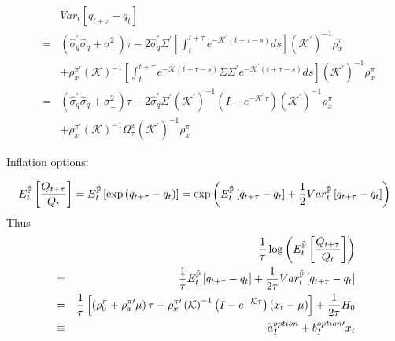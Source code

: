 \documentclass{article}
\begin{document}
\begin{eqnarray*}
&&Var_{t}\left[ q_{t+\tau }-q_{t}\right]  \\
&=&\left( \widehat{\sigma }_{q}^{\prime }\widehat{\sigma }_{q}+\sigma _{\bot
}^{2}\right) \tau -2\widehat{\sigma }_{q}^{\prime }\Sigma ^{\prime }\left[
\int_{t}^{t+\tau }e^{-\mathcal{K}^{\prime }\left( t+\tau -s\right) }ds\right]
\left( \mathcal{K}^{\prime }\right) ^{-1}\rho _{x}^{\pi } \\
&&+\rho _{x}^{\pi \prime }\left( \mathcal{K}\right) ^{-1}\left[
\int_{t}^{t+\tau }e^{-\mathcal{K}\left( t+\tau -s\right) }\Sigma \Sigma
^{\prime }e^{-\mathcal{K}^{\prime }\left( t+\tau -s\right) }ds\right] \left( 
\mathcal{K}^{\prime }\right) ^{-1}\rho _{x}^{\pi } \\
&=&\left( \widehat{\sigma }_{q}^{\prime }\widehat{\sigma }_{q}+\sigma _{\bot
}^{2}\right) \tau -2\widehat{\sigma }_{q}^{\prime }\Sigma ^{\prime }\left( 
\mathcal{K}^{\prime }\right) ^{-1}\left( I-e^{-\mathcal{K}^{\prime }\tau
}\right) \left( \mathcal{K}^{\prime }\right) ^{-1}\rho _{x}^{\pi } \\
&&+\rho _{x}^{\pi \prime }\left( \mathcal{K}\right) ^{-1}\Omega _{\tau
}^{x}\left( \mathcal{K}^{\prime }\right) ^{-1}\rho _{x}^{\pi }
\end{eqnarray*}

Inflation options:

\begin{equation*}
E_{t}^{\mathbb{\tilde{P}}}\left[ \frac{Q_{t+\tau }}{Q_{t}}\right] =E_{t}^{%
\mathbb{\tilde{P}}}\left[ \exp \left( q_{t+\tau }-q_{t}\right) \right] =\exp
\left( E_{t}^{\mathbb{\tilde{P}}}\left[ q_{t+\tau }-q_{t}\right] +\frac{1}{2}%
Var_{t}^{\mathbb{\tilde{P}}}\left[ q_{t+\tau }-q_{t}\right] \right) 
\end{equation*}%
Thus%
\begin{eqnarray*}
&&\frac{1}{\tau }\log \left( E_{t}^{\mathbb{\tilde{P}}}\left[ \frac{%
Q_{t+\tau }}{Q_{t}}\right] \right)  \\
&=&\frac{1}{\tau }E_{t}^{\mathbb{\tilde{P}}}\left[ q_{t+\tau }-q_{t}\right] +%
\frac{1}{2\tau }Var_{t}^{\mathbb{\tilde{P}}}\left[ q_{t+\tau }-q_{t}\right] 
\\
&=&\frac{1}{\tau }\left[ \left( \rho _{0}^{\pi }+\rho _{x}^{\pi \prime }\mu
\right) \tau +\rho _{x}^{\pi \prime }\left( \mathcal{K}\right) ^{-1}\left(
I-e^{-\mathcal{K}\tau }\right) \left( x_{t}-\mu \right) \right] +\frac{1}{%
2\tau }H_{0} \\
&\equiv &\widetilde{a}_{I}^{option}+\widetilde{b}_{I}^{option\prime }x_{t}
\end{eqnarray*}
\end{document}
